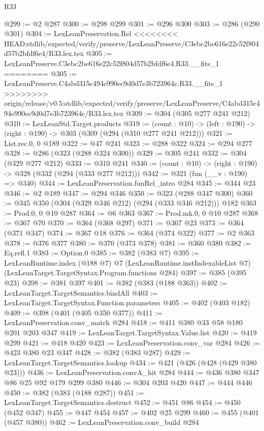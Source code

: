 \begin{lexlean}{R33}
\begin{coremodule}
{{{{{{{{@299 := @2 @287
@300 := @298 @299
@301 := @296 @300
@303 := @286 (@290 @301)
@304 := LexLeanPreservation.Rel
<<<<<<<< HEAD:stdlib/expected/verify/preserve/LexLeanPreserve/C3ebc2be616e22c52f804d57b2bfdf6e4/R33.lex.tex
@305 := LexLeanPreserve.C3ebc2be616e22c52f804d57b2bfdf6e4.R33.__fits_1
========
@305 := LexLeanPreserve.C4abd315c494e990ec9d0d7e3b723964c.R33.__fits_1
>>>>>>>> origin/release/v0.5:stdlib/expected/verify/preserve/LexLeanPreserve/C4abd315c494e990ec9d0d7e3b723964c/R33.lex.tex
@309 := @304 (@305 @277 @241 @212)
@310 := LexLeanStd.Target.products
@319 := (count : @10) -> (left : @190) -> (right : @190) -> @303 (@309 (@294 (@310 @277 @241 @212)))
@321 := List.rec.{0, 0} @189
@322 := @47 @241
@323 := @288 @322
@324 := @294 @277
@328 := @286 (@323 (@288 @324 @300))
@329 := @305 @241
@332 := @304 (@329 @277 @212)
@333 := @310 @241
@340 := (count : @10) -> (right : @190) -> @328 (@332 (@294 (@333 @277 @212)))
@342 := @321 (fun (__v : @190) => @340)
@344 := LexLeanPreservation.funRel_intro @284
@345 := @344 @23
@346 := @2 @189
@347 := @294 @346
@350 := @323 (@288 @347 @300)
@360 := @345 @350 (@304 (@329 @346 @212) (@294 (@333 @346 @212))) @182
@363 := Prod.{0, 0} @10 @287
@364 := @6 @363
@367 := Prod.mk.{0, 0} @10 @287
@368 := @367 @70
@370 := @364 (@368 @297)
@371 := @367 @23
@373 := @364 (@371 @347)
@374 := @367 @18
@376 := @364 (@374 @322)
@377 := @2 @363
@378 := @376 @377
@380 := @370 (@373 @378)
@381 := @360 @380
@382 := Eq.refl.{1}
@383 := Option.{0}
@385 := @382 (@383 @7)
@395 := LexLeanRuntime.index
    (@188 @7)
    @7
    (LexLeanRuntime.instIndexableList @7)
    (LexLeanTarget.TargetSyntax.Program.functions @284)
@397 := @385 (@395 @23)
@398 := @381 @397
@401 := @382 (@383 (@188 @363))
@402 := LexLeanTarget.TargetSemantics.bindAll
@403 := LexLeanTarget.TargetSyntax.Function.parameters
@405 := @402 (@403 @182)
@409 := @398 (@401 (@405 @350 @377))
@411 := LexLeanPreservation.conv_match @284
@418 := @411 @380 @33 @58 @180 @201 @203 @347
@419 := LexLeanTarget.TargetSyntax.Value.list
@420 := @419 @299
@421 := @418 @420
@423 := LexLeanPreservation.conv_var @284
@426 := @423 @380 @23 @347
@428 := @382 (@383 @287)
@429 := LexLeanTarget.TargetSemantics.lookup
@434 := @421 (@426 (@428 (@429 @380 @23)))
@436 := LexLeanPreservation.convA_hit @284
@444 := @436 @380 @347 @86 @25 @92 @179 @299 @380
@446 := @304 @203 @420
@447 := @444 @446
@450 := @382 (@383 (@188 @287))
@451 := LexLeanTarget.TargetSemantics.destruct
@452 := @451 @86
@454 := @450 (@452 @347)
@455 := @447 @454
@457 := @402 @25 @299
@460 := @455 (@401 (@457 @380))
@462 := LexLeanPreservation.conv_build @284
}}}}}}}}
\end{coremodule}
\end{lexlean}
